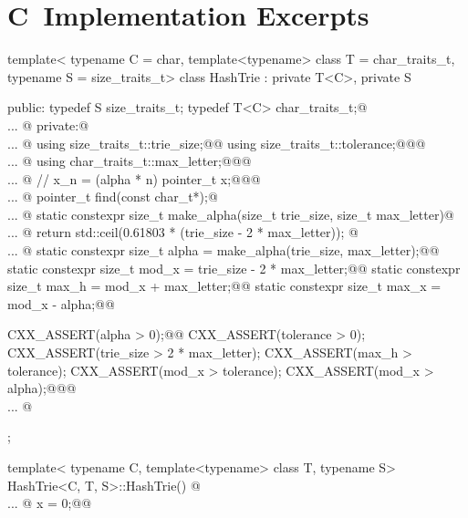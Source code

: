 \documentclass[a4paper,9pt,leqno]{article}
\makeatletter
\renewcommand{\=}{\protect\nobreakdash-\hspace{0pt}}
\renewcommand{\~}{\protect\nobreakdash--\hspace{0pt}}
\newcommand{\plusplus}{\textbf{\raisebox{1pt}{++}}}
\newcommand{\cplusplus}{\textbf{C}\plusplus}
\let\lst@ifskiplines\iffalse
\newcommand\skipnumbering[1]{%
	\setcounter{lstnumber}{\numexpr#1-1\relax}%
	\let\lst@ifskiplines\iftrue
	\\\lst@PlaceNumber
	\let\lst@ifskiplines\iffalse
	\lst@ifshowskiplines...\fi
}
\let\lst@PlaceNumber\@empty
\theoremstyle{plain}
\theoremstyle{definition}
\theoremstyle{remark}
\makeatother
\begin{document}
\section{\protect\cplusplus\ Implementation Excerpts}
%
%
\begin{hashtrielisting}[2006]
template<
	typename C = char,
	template<typename> class T = char_traits_t,
	typename S = size_traits_t>
class HashTrie :
	private T<C>,
	private S
{
public:
	typedef S size_traits_t;
	typedef T<C> char_traits_t;@\skipnumbering{2034}@
private:@\skipnumbering{2042}@
	using size_traits_t::trie_size;@\label{cpp-trie-size}@
	using size_traits_t::tolerance;@\label{cpp-tolerance}@@\skipnumbering{2045}@
	using char_traits_t::max_letter;@\label{cpp-max-letter}@@\skipnumbering{2230}@
	// x_n = (alpha * n) %
	pointer_t x;@\label{cpp-x}@@\skipnumbering{2249}@
	pointer_t find(const char_t*);@\skipnumbering{2255}@
	static constexpr size_t make_alpha(size_t trie_size, size_t max_letter)@\skipnumbering{2259}@
	{ return std::ceil(0.61803 * (trie_size - 2 * max_letter)); }@\skipnumbering{2266}@
	static constexpr size_t alpha = make_alpha(trie_size, max_letter);@\label{cpp-alpha}@
	static constexpr size_t mod_x = trie_size - 2 * max_letter;@\label{cpp-mod-x}@
	static constexpr size_t max_h = mod_x + max_letter;@\label{cpp-max-h}@
	static constexpr size_t max_x = mod_x - alpha;@\label{cpp-max-x}@

	CXX_ASSERT(alpha > 0);@\label{cpp-assert-begin}@
	CXX_ASSERT(tolerance > 0);
	CXX_ASSERT(trie_size > 2 * max_letter);
	CXX_ASSERT(max_h > tolerance);
	CXX_ASSERT(mod_x > tolerance);
	CXX_ASSERT(mod_x > alpha);@\label{cpp-assert-end}@@\skipnumbering{2296}@
};
\end{hashtrielisting}
%
%
\begin{hashtrielisting}[2298]
template<
	typename C,
	template<typename> class T,
	typename S>
HashTrie<C, T, S>::HashTrie()
{@\skipnumbering{2318}@
	x = 0;@\label{cpp-x-init}@
}
\end{hashtrielisting}
%
\end{document}
